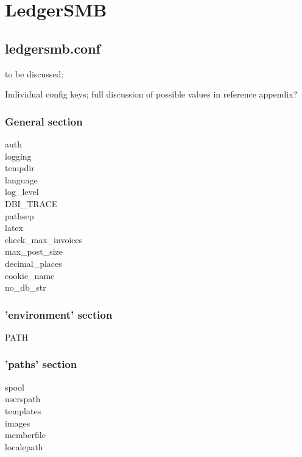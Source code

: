 \section{LedgerSMB}

\subsection{ledgersmb.conf}

to be discussed:

Individual config keys; full discussion of possible values in reference appendix?

\subsubsection{General section}

\begin{description}
\item[auth]
\item[logging]
\item[tempdir]
\item[language]
\item[log\_level]
\item[DBI\_TRACE]
\item[pathsep]
\item[latex]
\item[check\_max\_invoices]
\item[max\_post\_size]
\item[decimal\_places]
\item[cookie\_name]
\item[no\_db\_str]

\end{description}

\subsubsection{'environment' section}

\begin{description}
\item[PATH]
\end{description}


\subsubsection{'paths' section}

\begin{description}
\item [spool]
\item [userspath]
\item [templates]
\item [images]
\item [memberfile]
\item [localepath]
\end{description}

